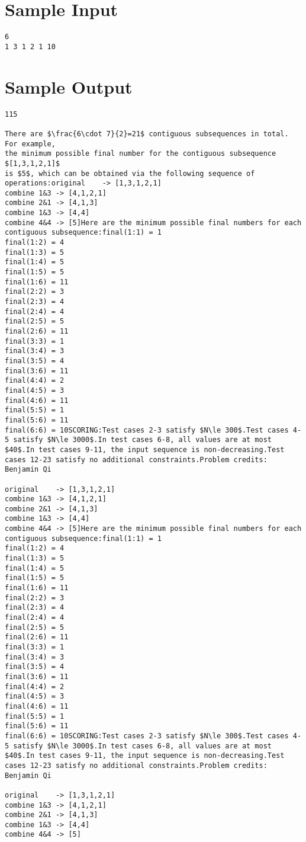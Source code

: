 \documentclass[12pt]{article}
\begin{document}
\section*{Sample Input}
\begin{verbatim}
6
1 3 1 2 1 10
\end{verbatim}

\section*{Sample Output}
\begin{verbatim}
115

There are $\frac{6\cdot 7}{2}=21$ contiguous subsequences in total. For example,
the minimum possible final number for the contiguous subsequence $[1,3,1,2,1]$
is $5$, which can be obtained via the following sequence of operations:original    -> [1,3,1,2,1]
combine 1&3 -> [4,1,2,1]
combine 2&1 -> [4,1,3]
combine 1&3 -> [4,4]
combine 4&4 -> [5]Here are the minimum possible final numbers for each contiguous subsequence:final(1:1) = 1
final(1:2) = 4
final(1:3) = 5
final(1:4) = 5
final(1:5) = 5
final(1:6) = 11
final(2:2) = 3
final(2:3) = 4
final(2:4) = 4
final(2:5) = 5
final(2:6) = 11
final(3:3) = 1
final(3:4) = 3
final(3:5) = 4
final(3:6) = 11
final(4:4) = 2
final(4:5) = 3
final(4:6) = 11
final(5:5) = 1
final(5:6) = 11
final(6:6) = 10SCORING:Test cases 2-3 satisfy $N\le 300$.Test cases 4-5 satisfy $N\le 3000$.In test cases 6-8, all values are at most $40$.In test cases 9-11, the input sequence is non-decreasing.Test cases 12-23 satisfy no additional constraints.Problem credits: Benjamin Qi

original    -> [1,3,1,2,1]
combine 1&3 -> [4,1,2,1]
combine 2&1 -> [4,1,3]
combine 1&3 -> [4,4]
combine 4&4 -> [5]Here are the minimum possible final numbers for each contiguous subsequence:final(1:1) = 1
final(1:2) = 4
final(1:3) = 5
final(1:4) = 5
final(1:5) = 5
final(1:6) = 11
final(2:2) = 3
final(2:3) = 4
final(2:4) = 4
final(2:5) = 5
final(2:6) = 11
final(3:3) = 1
final(3:4) = 3
final(3:5) = 4
final(3:6) = 11
final(4:4) = 2
final(4:5) = 3
final(4:6) = 11
final(5:5) = 1
final(5:6) = 11
final(6:6) = 10SCORING:Test cases 2-3 satisfy $N\le 300$.Test cases 4-5 satisfy $N\le 3000$.In test cases 6-8, all values are at most $40$.In test cases 9-11, the input sequence is non-decreasing.Test cases 12-23 satisfy no additional constraints.Problem credits: Benjamin Qi

original    -> [1,3,1,2,1]
combine 1&3 -> [4,1,2,1]
combine 2&1 -> [4,1,3]
combine 1&3 -> [4,4]
combine 4&4 -> [5]


\end{verbatim}
\end{document}
